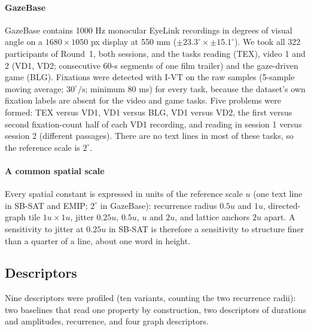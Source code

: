 \documentclass[man,floatsintext,12pt]{apa7}
\begin{document}
\paragraph{GazeBase} GazeBase \citep{griffith2021gazebase} contains 1000 Hz monocular EyeLink recordings in degrees of visual angle on a $1680\times1050$ px display at 550 mm ($\pm 23.3^\circ\times\pm 15.1^\circ$). We took all 322 participants of Round~1, both sessions, and the tasks reading (TEX), video 1 and 2 (VD1, VD2; consecutive 60-s segments of one film trailer) and the gaze-driven game (BLG). Fixations were detected with I-VT on the raw samples (5-sample moving average; $30^\circ/\mathrm{s}$; minimum 80 ms) for every task, because the dataset's own fixation labels are absent for the video and game tasks. Five problems were formed: TEX versus VD1, VD1 versus BLG, VD1 versus VD2, the first versus second fixation-count half of each VD1 recording, and reading in session 1 versus session 2 (different passages). There are no text lines in most of these tasks, so the reference scale is $2^\circ$.

\paragraph{A common spatial scale} Every spatial constant is expressed in units of the reference scale $u$ (one text line in SB-SAT and EMIP; $2^\circ$ in GazeBase): recurrence radius $0.5u$ and $1u$, directed-graph tile $1u\times1u$, jitter $0.25u$, $0.5u$, $u$ and $2u$, and lattice anchors $2u$ apart. A sensitivity to jitter at $0.25u$ in SB-SAT is therefore a sensitivity to structure finer than a quarter of a line, about one word in height.

\begin{table}[!htbp]
\centering\small
\caption{The thirteen problems. Label level: whether the label varies within participants, is constant within each participant, or both. Trials and participants after exclusions.}
\label{tab:problems}
\resizebox{\linewidth}{!}{}
\end{table}

\subsection{Descriptors}\label{sec:desc}
Nine descriptors were profiled (ten variants, counting the two recurrence radii): two baselines that read one property by construction, two descriptors of durations and amplitudes, recurrence, and four graph descriptors.
\end{document}
